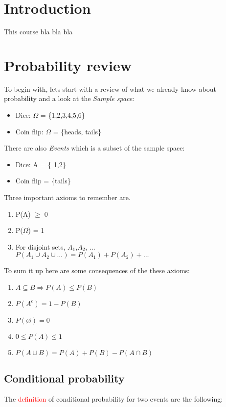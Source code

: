 

\section{Introduction}

This course bla bla bla

\section{Probability review}
To begin with, lets start with a review of what we already know about probability and a look at the \emph{Sample space}: 
\begin{itemize}
    \item Dice: $\Omega$ = \{1,2,3,4,5,6\}
    \item Coin flip: $\Omega$ = \{heads, tails\}
\end{itemize}
There are also \emph{Events} which is a subset of the sample space:
\begin{itemize}
    \item Dice: A = \{ 1,2\}
    \item Coin flip = \{tails\}
\end{itemize}
Three important axioms to remember are.
\begin{enumerate}
    \item P(A) $\ge$ 0
    \item P($\Omega$) = 1
    \item For disjoint sets, $A_1$,$A_2$, $\dots$ \\ $P(A_1 \cup A_2 \cup \dots) = P(A_1) + P(A_2) + \dots$         
\end{enumerate}


To sum it up here are some consequences of the these axioms:

\begin{enumerate}
    \item $A \subseteq B \Rightarrow P(A) \le P(B)$
    \item $P(A^{c}) = 1 - P(B)$
    \item $P(\diameter)  = 0$
    \item $0 \le P(A) \le 1$
    \item $P(A \cup B)  = P(A) + P(B) - P(A\cap B)$
\end{enumerate}


\subsection{Conditional probability}
The \textcolor{red}{definition} of conditional probability for two events are the following:

